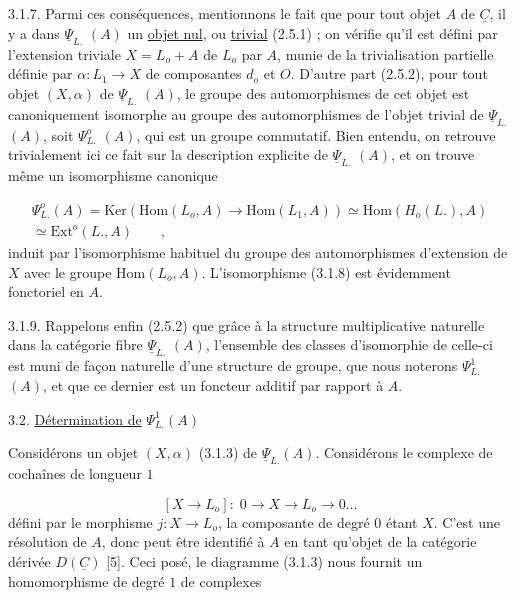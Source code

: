 3.1.7.  Parmi ces conséquences, mentionnons le fait que pour tout objet $A$ de $\underline{C}$, il y a dans $\underline{\Psi}_{L.}$ $(A)$ un \underline{objet nul}, ou \underline{trivial} (2.5.1) ; on vérifie qu'il est défini par l'extension triviale $X = L_o + A$ de $L_o$ par $A$, munie de la trivialisation partielle définie par $\alpha : L_1 \longrightarrow X$ de composantes $d_o$ et $O$. D'autre part (2.5.2), pour tout objet $(X,\alpha)$ de $\underline{\Psi}_{L.}$ $(A)$, le groupe des automorphismes de cet objet est canoniquement isomorphe au groupe des automorphismes de l'objet trivial de $\underline{\Psi}_{L.}$ $(A)$, soit $\Psi^{o}_{L.}$ $(A)$, qui est un groupe commutatif. Bien entendu, on retrouve trivialement ici ce fait sur la description explicite de $\underline{\Psi}_{L.}$ $(A)$, et on trouve même un isomorphisme canonique

\begin{multline}\tag{3.1.8}
\Psi^{o}_{L.} (A) = \mathrm{Ker}(\mathrm{Hom}(L_o,A) \to \mathrm{Hom}(L_1,A)) \simeq \mathrm{Hom}(H_o(L.),A) \\ \simeq \mathrm{Ext}^{o}(L.,A) \qquad ,
\end{multline}
induit par l'isomorphisme habituel du groupe des automorphismes d'extension de $X$ avec le groupe $\mathrm{Hom}(L_o,A)$. L'isomorphisme (3.1.8) est évidemment fonctoriel en $A$.

3.1.9.  Rappelons enfin (2.5.2) que grâce à la structure multiplicative naturelle dans la catégorie fibre $\underline{\Psi}_{L.}$ $(A)$, l'ensemble des classes d'isomorphie de celle-ci est muni de façon naturelle d'une structure de groupe, que nous noterons $\Psi^{1}_{L.}$ $(A)$, et que ce dernier est un foncteur additif par rapport à $A$.




3.2. \underline{Détermination de} $\Psi^1_{L.} (A)$

Considérons un objet $(X,\alpha)$ (3.1.3) de $\underline{\Psi}_{L.} (A)$. Considérons le complexe de cochaînes de longueur $1$

\begin{equation}\tag{3.2.1}
[X \to L_o] : \; 0 \longrightarrow X \longrightarrow L_o \longrightarrow 0 \ldots
\end{equation}
défini par le morphisme $j : X \longrightarrow L_o$, la composante de degré $0$ étant $X$. C'est une résolution de $A$, donc peut être identifié à $A$ en tant qu'objet de la catégorie dérivée $D(\underline{C})$ [5]. Ceci posé, le diagramme (3.1.3) nous fournit un homomorphisme de degré $1$ de complexes

